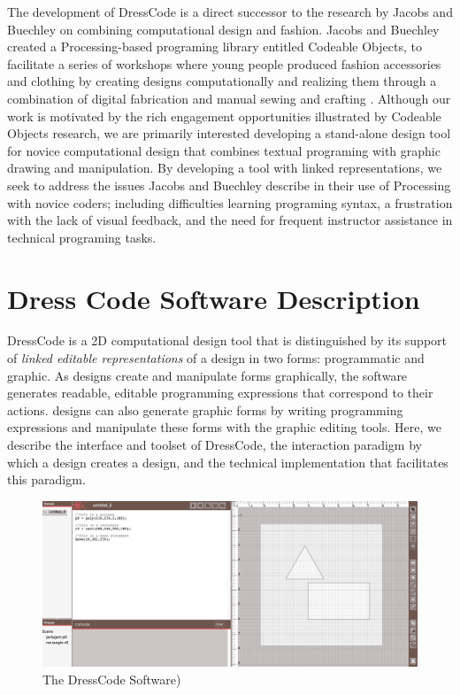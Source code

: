 \documentclass{sigchi}
\begin{document}
The development of DressCode is a direct successor to the research by Jacobs and Buechley on combining computational design and fashion. Jacobs and Buechley created a Processing-based programing library entitled Codeable Objects, to facilitate a series of workshops where young people produced fashion accessories and clothing by creating designs computationally and realizing them through a combination of digital fabrication and manual sewing and crafting \cite{codeable_objects}. Although our work is motivated by the rich engagement opportunities illustrated by Codeable Objects research, we are primarily interested developing a stand-alone design tool for novice computational design that combines textual programing with graphic drawing and manipulation. By developing a tool with linked representations, we seek to address the issues Jacobs and Buechley describe in their use of Processing with novice coders; including difficulties learning programing syntax, a frustration with the lack of visual feedback, and the need for frequent instructor assistance in technical programing tasks. 


\section{Dress Code Software Description}
DressCode is a 2D computational design tool that is distinguished by its support of \emph{linked editable representations} of a design in two forms: programmatic and graphic. As designs create and manipulate forms graphically, the software generates readable, editable programming expressions that correspond to their actions. designs can also generate graphic forms by writing programming expressions and manipulate these forms with the graphic editing tools. Here, we describe the interface and toolset of DressCode, the interaction paradigm by which a design creates a design, and the technical implementation that facilitates this paradigm.

\begin{figure}
\includegraphics[width=\textwidth]{images/application_image_sm_content.jpg}
\caption{The DressCode Software)}
\label{fig:application_image}
\end{figure}
\end{document}
